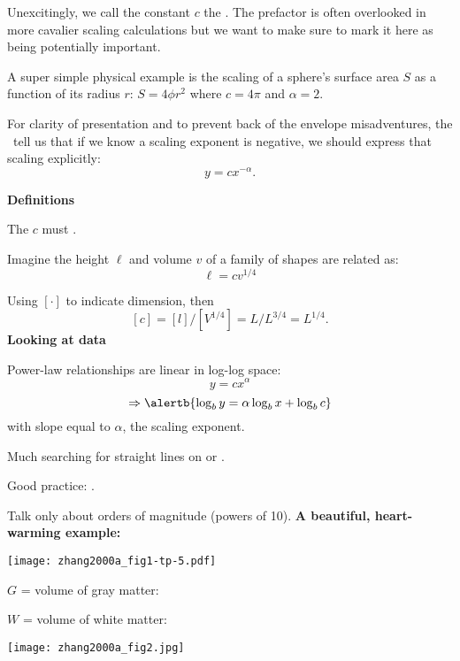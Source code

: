 Unexcitingly, we call the constant $c$ the .
The prefactor is often overlooked in more cavalier
scaling calculations
but we want to make sure to mark it here as being
potentially important.

A super simple physical example is the scaling of a
sphere's surface area $S$ as a function of its radius $r$:
$
S
=
4\phi
r^2
$
where
$c = 4\pi$
and
$\alpha = 2$.

For clarity of presentation and to prevent back of the envelope misadventures,
the \monks\ tell us that if we know a scaling exponent is negative,
we should express that scaling explicitly:
\begin{equation}
y
=
c
x^{-\alpha}.
\label{eq.pocsbook:powerlawnegative}
\end{equation}


\textbf{Definitions}


The  $c$ must .

Imagine the height $\ell$ and volume $v$ of 
a family of shapes
are related as:
$$\ell = c v^{1/4}$$

Using $[ \cdot ]$ to indicate dimension, then 
$$[c] = [l]/[V^{1/4}] = L/L^{3/4} = L^{1/4}.$$
\textbf{Looking at data}


Power-law relationships
are linear in log-log space:
$$y = c x^\alpha $$
$$ \Rightarrow \alertb{\log_{b} y = \alpha \log_{b} x + \log_{b} c} $$
with slope equal to $\alpha$, the scaling exponent.

Much searching for straight lines on 
 or .

Good practice: .

Talk only about orders of magnitude (powers of 10).
\textbf{A beautiful, heart-warming example:}

\begin{marginfigure}[]
  \texttt{[image: zhang2000a\_fig1-tp-5.pdf]} 
\end{marginfigure}

$G$ = volume of gray matter:\\ 

$W$ = volume of white matter:\\ 

\begin{marginfigure}[]
  \texttt{[image: zhang2000a\_fig2.jpg]}  
\end{marginfigure}

